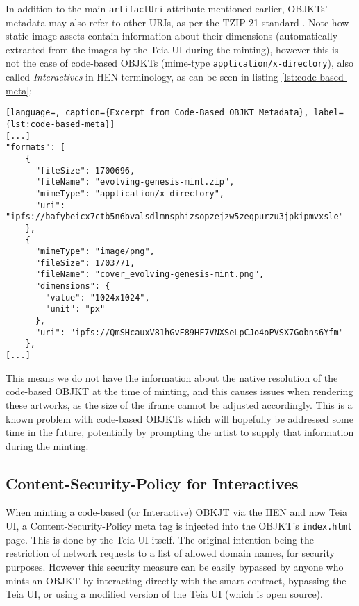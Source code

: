In addition to the main \texttt{artifactUri} attribute mentioned earlier, OBJKTs' metadata may also refer to other URIs, as per the TZIP-21 standard \cite{dechantTZIP21RichMetadata2020}.
Note how static image assets contain information about their dimensions (automatically extracted from the images by the Teia UI during the minting), however this is not the case of code-based OBJKTs (mime-type \texttt{application/x-directory}), also called \emph{Interactives} in HEN terminology, as can be seen in listing \autoref{lst:code-based-meta}:

\begin{lstlisting}[language=, caption={Excerpt from Code-Based OBJKT Metadata}, label={lst:code-based-meta}]
[...]
"formats": [
    {
      "fileSize": 1700696,
      "fileName": "evolving-genesis-mint.zip",
      "mimeType": "application/x-directory",
      "uri": "ipfs://bafybeicx7ctb5n6bvalsdlmnsphizsopzejzw5zeqpurzu3jpkipmvxsle"
    },
    {
      "mimeType": "image/png",
      "fileSize": 1703771,
      "fileName": "cover_evolving-genesis-mint.png",
      "dimensions": {
        "value": "1024x1024",
        "unit": "px"
      },
      "uri": "ipfs://QmSHcauxV81hGvF89HF7VNXSeLpCJo4oPVSX7Gobns6Yfm"
    },
[...]
\end{lstlisting}

This means we do not have the information about the native resolution of the code-based OBJKT at the time of minting, and this causes issues when rendering these artworks, as the size of the iframe cannot be adjusted accordingly. This is a known problem with code-based OBJKTs which will hopefully be addressed some time in the future, potentially by prompting the artist to supply that information during the minting.

\subsection{Content-Security-Policy for Interactives}

When minting a code-based (or Interactive) OBKJT via the HEN and now Teia UI, a Content-Security-Policy meta tag is injected into the OBJKT's \texttt{index.html} page. This is done by the Teia UI itself. The original intention being the restriction of network requests to a list of allowed domain names, for security purposes. However this security measure can be easily bypassed by anyone who mints an OBJKT by interacting directly with the smart contract, bypassing the Teia UI, or using a modified version of the Teia UI (which is open source).

